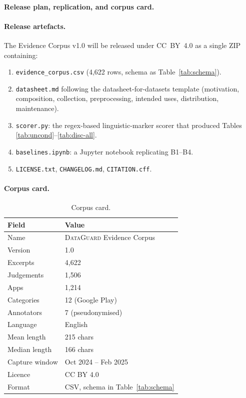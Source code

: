 \documentclass[11pt,a4paper]{article}
\newcommand{\dataguard}{\textsc{DataGuard}}
\begin{document}
\paragraph{Release plan, replication, and corpus card.}\label{sec:release}

\paragraph{Release artefacts.}
The Evidence Corpus v1.0 will be released under CC~BY~4.0 as a
single ZIP containing:

\begin{enumerate}[label=\textbf{R\arabic*.},leftmargin=*,itemsep=2pt,topsep=2pt]
\item \texttt{evidence\_corpus.csv} (4{,}622 rows, schema as
Table~\ref{tab:schema}).
\item \texttt{datasheet.md} following the datasheet-for-datasets
template (motivation, composition, collection, preprocessing,
intended uses, distribution, maintenance).
\item \texttt{scorer.py}: the regex-based linguistic-marker scorer
that produced Tables \ref{tab:uncond}--\ref{tab:disc-all}.
\item \texttt{baselines.ipynb}: a Jupyter notebook replicating B1--B4.
\item \texttt{LICENSE.txt}, \texttt{CHANGELOG.md},
\texttt{CITATION.cff}.
\end{enumerate}

\paragraph{Corpus card.}
\begin{table}[t]
\centering\small
\caption{Corpus card.}
\label{tab:card}
\begin{tabular}{ll}
\toprule
Field & Value \\
\midrule
Name              & \dataguard{} Evidence Corpus \\
Version           & 1.0 \\
Excerpts          & 4{,}622 \\
Judgements        & 1{,}506 \\
Apps              & 1{,}214 \\
Categories        & 12 (Google Play) \\
Annotators        & 7 (pseudonymised) \\
Language          & English \\
Mean length       & 215 chars \\
Median length     & 166 chars \\
Capture window    & Oct 2024 -- Feb 2025 \\
Licence           & CC BY 4.0 \\
Format            & CSV, schema in Table~\ref{tab:schema} \\
\bottomrule
\end{tabular}
\end{table}
\end{document}
